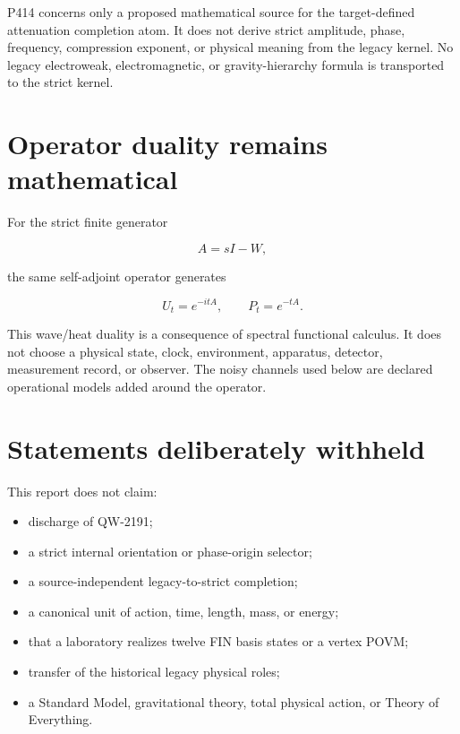 \documentclass[11pt,a4paper,openany]{report}
\begin{document}
P414 concerns only a proposed mathematical source for the target-defined attenuation completion atom. It does not derive strict amplitude, phase, frequency, compression exponent, or physical meaning from the legacy kernel. No legacy electroweak, electromagnetic, or gravity-hierarchy formula is transported to the strict kernel.

\section{Operator duality remains mathematical}

For the strict finite generator

\[
A=sI-W,
\]

the same self-adjoint operator generates

\[
U_t=e^{-itA},
\qquad
P_t=e^{-tA}.
\]

This wave/\allowbreak{}heat duality is a consequence of spectral functional calculus. It does not choose a physical state, clock, environment, apparatus, detector, measurement record, or observer. The noisy channels used below are declared operational models added around the operator.

\section{Statements deliberately withheld}

This report does not claim:

\begin{itemize}
\item 
discharge of QW-2191;

\item 
a strict internal orientation or phase-origin selector;

\item 
a source-independent legacy-to-strict completion;

\item 
a canonical unit of action, time, length, mass, or energy;

\item 
that a laboratory realizes twelve FIN basis states or a vertex POVM;

\item 
transfer of the historical legacy physical roles;

\item 
a Standard Model, gravitational theory, total physical action, or Theory of Everything.

\end{itemize}
\end{document}
